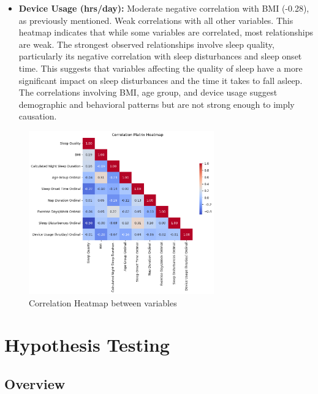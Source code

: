 \documentclass[conference]{IEEEtran}
\begin{document}
\begin{itemize}
\item \textbf{Device Usage (hrs/day):} Moderate negative correlation with BMI (-0.28), as previously mentioned.
Weak correlations with all other variables.
This heatmap indicates that while some variables are correlated, most relationships are weak. The strongest observed relationships involve sleep quality, particularly its negative correlation with sleep disturbances and sleep onset time. This suggests that variables affecting the quality of sleep have a more significant impact on sleep disturbances and the time it takes to fall asleep. The correlations involving BMI, age group, and device usage suggest demographic and behavioral patterns but are not strong enough to imply causation.
    \end{itemize}
    \begin{figure}[ht]
        \centering
        \includegraphics[width=8cm]{images/corrheat.png}
        \caption{Correlation Heatmap between variables}
        \label{fig:corrheat}
      \end{figure}
\section{Hypothesis Testing}
\subsection*{Overview}
\end{document}
